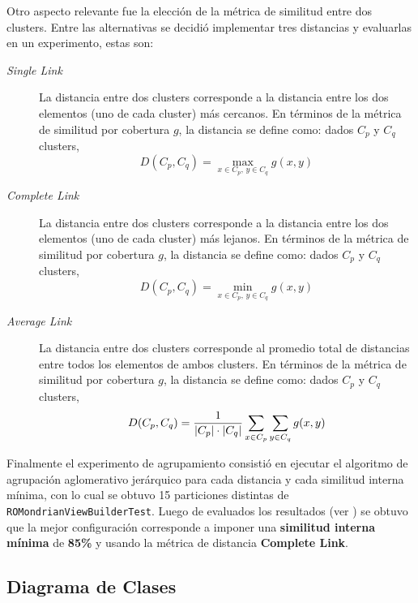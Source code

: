 \par Otro aspecto relevante fue la elección de la métrica de similitud entre dos clusters. Entre las alternativas se decidió implementar tres distancias y evaluarlas en un experimento, estas son: 
\begin{description}
\item[\emph{Single Link}] La distancia entre dos clusters corresponde a la distancia entre los dos elementos (uno de cada cluster) más cercanos. En términos de la métrica de similitud por cobertura $g$, la distancia se define como: dados $C_p$ y $C_q$ clusters,
\[ D(C_p,C_q) = \max_{x \in C_p,\, y  \in C_q} g(x,y) \]

\item[\emph{Complete Link}] La distancia entre dos clusters corresponde a la distancia entre los dos elementos (uno de cada cluster) más lejanos. En términos de la métrica de similitud por cobertura $g$, la distancia se define como: dados $C_p$ y $C_q$ clusters,
\[ D(C_p,C_q) = \min_{x \in C_p,\, y  \in C_q} g(x,y) \]

\item[\emph{Average Link}] La distancia entre dos clusters corresponde al promedio total de distancias entre todos los elementos de ambos clusters.  En términos de la métrica de similitud por cobertura $g$, la distancia se define como: dados $C_p$ y $C_q$ clusters,
\[ D(C_p,C_q) = \dfrac{1}{\vert C_p \vert\cdot\vert C_q \vert} \sum_{x \in C_p} \sum_{y  \in C_q} g(x,y) \]


\end{description}


\par Finalmente el experimento de agrupamiento consistió en ejecutar el algoritmo de agrupación aglomerativo jerárquico para cada distancia y cada similitud interna mínima, con lo cual se obtuvo 15 particiones distintas de {\tt ROMondrianViewBuilderTest}. Luego de evaluados los resultados (ver ) se obtuvo que la mejor configuración corresponde a imponer una \textbf{similitud interna mínima} de \textbf{85\%} y usando la métrica de distancia \textbf{Complete Link}.


\subsection{Diagrama de Clases}

